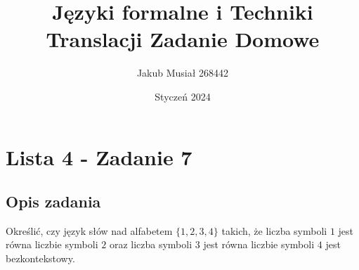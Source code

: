 \documentclass[12pt]{article}
\title{Języki formalne i Techniki Translacji \newline Zadanie Domowe}
\author{Jakub Musiał 268442}
\date{Styczeń 2024}
\begin{document}
\maketitle

\hspace{1cm}

\section*{Lista 4 - Zadanie 7}

\subsection*{Opis zadania}
    Określić, czy język słów nad alfabetem $\{1, 2, 3, 4\}$ takich, że liczba symboli $1$ jest równa liczbie symboli $2$ oraz liczba symboli $3$ jest równa liczbie symboli $4$ jest bezkontekstowy.
\end{document}

